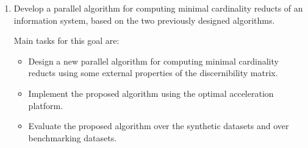 \documentclass[11pt]{article}   %
\begin{document}
\begin{enumerate}
  \item Develop a parallel algorithm for computing minimal cardinality reducts of an information system, based 
  		on the two previously designed algorithms.
  		
  		Main tasks for this goal are:
  		\begin{itemize}
  		\item Design a new parallel algorithm for computing minimal cardinality reducts using some external
  		      properties of the discernibility matrix.
  		\item Implement the proposed algorithm using the optimal acceleration platform.
  		\item Evaluate the proposed algorithm over the synthetic datasets and over benchmarking datasets.
  		\end{itemize}
  \end{enumerate}
%
%  
\end{document}
